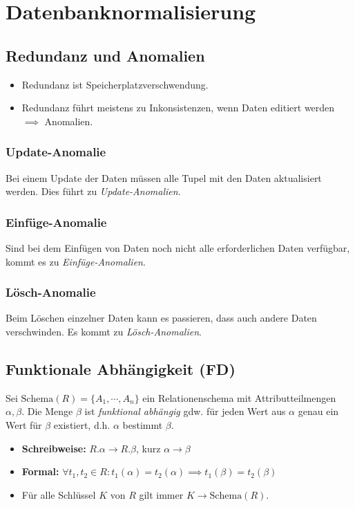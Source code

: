 \documentclass[a4paper, 11pt, accentcolor = tud3b]{tudreport}
\newcommand{\Schema}{\text{Schema}}
\begin{document}
        \section{Datenbanknormalisierung} %
            \subsection{Redundanz und Anomalien} %
                \begin{itemize}
                	\item Redundanz ist Speicherplatzverschwendung.
                	\item Redundanz führt meistens zu Inkonsistenzen, wenn Daten editiert werden \(\implies\) Anomalien.
                \end{itemize}

                \subsubsection{Update-Anomalie} %
                    Bei einem Update der Daten müssen alle Tupel mit den Daten aktualisiert werden. Dies führt zu \textit{Update-Anomalien}.

                \subsubsection{Einfüge-Anomalie} %
                    Sind bei dem Einfügen von Daten noch nicht alle erforderlichen Daten verfügbar, kommt es zu \textit{Einfüge-Anomalien}.

                \subsubsection{Lösch-Anomalie} %
                    Beim Löschen einzelner Daten kann es passieren, dass auch andere Daten verschwinden. Es kommt zu \textit{Lösch-Anomalien}.

            \subsection{Funktionale Abhängigkeit (FD)} %
                Sei \( \Schema(R) = \{ A _ 1, \cdots, A _ n \} \) ein Relationenschema mit Attributteilmengen \( \alpha, \beta \). Die Menge \( \beta \) ist \textit{funktional abhängig} gdw. für jeden Wert aus \(\alpha\) genau ein Wert für \(\beta\) existiert, d.h. \(\alpha\) bestimmt \(\beta\).
                \begin{itemize}
                	\item \textbf{Schreibweise:} \( R.\alpha \rightarrow R.\beta \), kurz \( \alpha \rightarrow \beta \)
                	\item \textbf{Formal:} \( \forall t_1, t_2 \in R : t_1(\alpha) = t_2(\alpha) \implies t_1(\beta) = t_2(\beta) \)
                	\item Für alle Schlüssel \( K \) von \( R \) gilt immer \( K \rightarrow \Schema(R) \).
                \end{itemize}
\end{document}
